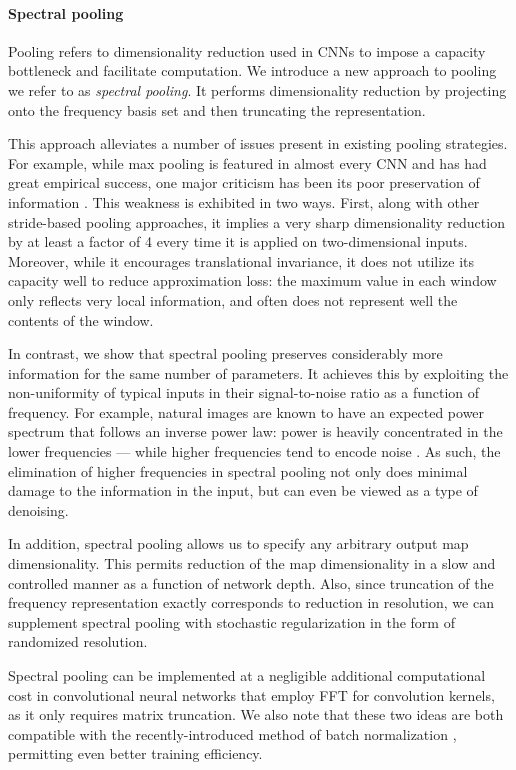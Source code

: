 \documentclass{article} %
\begin{document}
\paragraph{Spectral pooling} Pooling refers to dimensionality reduction used in CNNs to impose a capacity bottleneck and facilitate computation. We introduce a new approach to pooling we refer to as \emph{spectral pooling}. It performs dimensionality reduction by projecting onto the frequency basis set and then truncating the representation.

This approach alleviates a number of issues present in existing pooling strategies. For example, while max pooling is featured in almost every CNN and has had great empirical success, one major criticism has been its poor preservation of information \citep{hinton_ama,hinton-2014}. This weakness is exhibited in two ways. First, along with other stride-based pooling approaches, it implies a very sharp dimensionality reduction by at least a factor of 4 every time it is applied on two-dimensional inputs. Moreover, while it encourages translational invariance, it does not utilize its capacity well to reduce approximation loss: the maximum value in each window only reflects very local information, and often does not represent well the contents of the window.

In contrast, we show that spectral pooling preserves considerably more information for the same number of parameters. It achieves this by exploiting the non-uniformity of typical inputs in their signal-to-noise ratio as a function of frequency. For example, natural images are known to have an expected power spectrum that follows an inverse power law: power is heavily concentrated in the lower frequencies --- while higher frequencies tend to encode noise \citep{torralba_statistics_2003}. As such, the elimination of higher frequencies in spectral pooling not only does minimal damage to the information in the input, but can even be viewed as a type of denoising.

In addition, spectral pooling allows us to specify any arbitrary output map dimensionality. This permits reduction of the map dimensionality in a slow and controlled manner as a function of network depth.  Also, since truncation of the frequency representation exactly corresponds to reduction in resolution, we can supplement spectral pooling with stochastic regularization in the form of randomized resolution.

Spectral pooling can be implemented at a negligible additional computational cost in convolutional neural networks that employ FFT for convolution kernels, as it only requires matrix truncation.  We also note that these two ideas are both compatible with the recently-introduced method of batch normalization \citep{DBLP:journals/corr/IoffeS15}, permitting even better training efficiency. 
\end{document}
